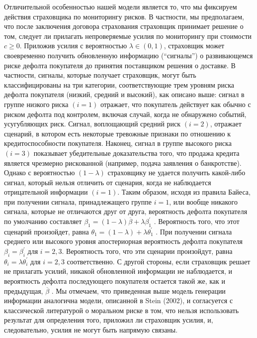 \documentclass[a4paper,12pt]{article}
\begin{document}
Отличительной особенностью нашей модели является то, что мы фиксируем действия страховщика по мониторингу рисков. В частности, мы предполагаем, что после заключения договора страхования страховщик принимает решение о том, следует ли прилагать непроверяемые усилия по мониторингу при стоимости $c \geq 0$. Приложив усилия с вероятностью $\lambda \in (0,1)$, страховщик может своевременно получить обновленную информацию (“сигналы”) о развивающемся риске дефолта покупателя до принятия поставщиком решения о доставке. В частности, сигналы, которые получает страховщик, могут быть классифицированы на три категории, соответствующие трем уровням риска дефолта покупателя (низкий, средний и высокий), как описано выше: сигнал в группе низкого риска $(i = 1)$ отражает, что покупатель действует как обычно с риском дефолта под контролем, включая случай, когда не обнаружено событий, усугубляющих риск. Сигнал, воплощающий средний риск $(i = 2)$, отражает сценарий, в котором есть некоторые тревожные признаки по отношению к кредитоспособности покупателя. Наконец, сигнал в группе высокого риска $(i = 3)$ показывает убедительные доказательства того, что продажа кредита является чрезмерно рискованной (например, подача заявления о банкротстве). Однако с вероятностью $(1 - \lambda)$ страховщику не удается получить какой-либо сигнал, который нельзя отличить от сценария, когда не наблюдается отрицательной информации $(i = 1)$. Таким образом, исходя из правила Байеса, при получении сигнала, принадлежащего группе $i = 1$, или вообще никакого сигнала, которые не отличаются друг от друга, вероятность дефолта покупателя по умолчанию составляет $\beta_{1} = (1 - \lambda)\overline{\beta} + \lambda\beta_{1}^{'}$ . Вероятность того, что этот сценарий произойдет, равна $\theta_{1} = (1 - \lambda) + \lambda\theta_{1}^{'}$ . При получении сигнала среднего или высокого уровня апостериорная вероятность дефолта покупателя $\beta_{i} = \beta_{i}^{'}$ для $i = 2, 3$. Вероятность того, что эти сценарии произойдут, равна $\theta_{i} = \lambda\theta_{i}^{'}$ для $i = 2, 3$ соответственно. С другой стороны, если страховщик решает не прилагать усилий, никакой обновленной информации не наблюдается, и вероятность дефолта последующего покупателя остается такой же, как и предыдущая, $\overline{\beta}$ . Мы отмечаем, что приведенная выше модель генерации информации аналогична модели, описанной в Stein (2002), и согласуется с классической литературой о моральном риске в том, что нельзя использовать результат для определения того, приложил ли страховщик усилия, и, следовательно, усилия не могут быть напрямую связаны.
\end{document}
